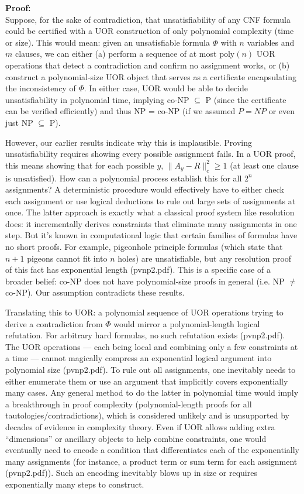 \documentclass[11pt]{article}
\begin{document}
\textbf{Proof:} \\
Suppose, for the sake of contradiction, that unsatisfiability of any CNF formula could be certified with a UOR construction of only polynomial complexity (time or size). This would mean: given an unsatisfiable formula \(\Phi\) with \(n\) variables and \(m\) clauses, we can either (a) perform a sequence of at most \(\mathrm{poly}(n)\) UOR operations that detect a contradiction and confirm no assignment works, or (b) construct a polynomial-size UOR object that serves as a certificate encapsulating the inconsistency of \(\Phi\). In either case, UOR would be able to decide unsatisfiability in polynomial time, implying co-NP \(\subseteq\) P (since the certificate can be verified efficiently) and thus NP = co-NP (if we assumed \(P = NP\) or even just NP \(\subseteq\) P).

However, our earlier results indicate why this is implausible. Proving unsatisfiability requires showing every possible assignment fails. In a UOR proof, this means showing that for each possible \(y\), \(\|A_y - R\|_c^2 \ge 1\) (at least one clause is unsatisfied). How can a polynomial process establish this for all \(2^n\) assignments? A deterministic procedure would effectively have to either check each assignment or use logical deductions to rule out large sets of assignments at once. The latter approach is exactly what a classical proof system like resolution does: it incrementally derives constraints that eliminate many assignments in one step. But it’s known in computational logic that certain families of formulas have no short proofs. For example, pigeonhole principle formulas (which state that \(n+1\) pigeons cannot fit into \(n\) holes) are unsatisfiable, but any resolution proof of this fact has exponential length (pvnp2.pdf). This is a specific case of a broader belief: co-NP does not have polynomial-size proofs in general (i.e. NP \(\neq\) co-NP). Our assumption contradicts these results.

Translating this to UOR: a polynomial sequence of UOR operations trying to derive a contradiction from \(\Phi\) would mirror a polynomial-length logical refutation. For arbitrary hard formulas, no such refutation exists (pvnp2.pdf). The UOR operations --- each being local and combining only a few constraints at a time --- cannot magically compress an exponential logical argument into polynomial size (pvnp2.pdf). To rule out all assignments, one inevitably needs to either enumerate them or use an argument that implicitly covers exponentially many cases. Any general method to do the latter in polynomial time would imply a breakthrough in proof complexity (polynomial-length proofs for all tautologies/contradictions), which is considered unlikely and is unsupported by decades of evidence in complexity theory. Even if UOR allows adding extra “dimensions” or ancillary objects to help combine constraints, one would eventually need to encode a condition that differentiates each of the exponentially many assignments (for instance, a product term or sum term for each assignment (pvnp2.pdf)). Such an encoding inevitably blows up in size or requires exponentially many steps to construct.
\end{document}
